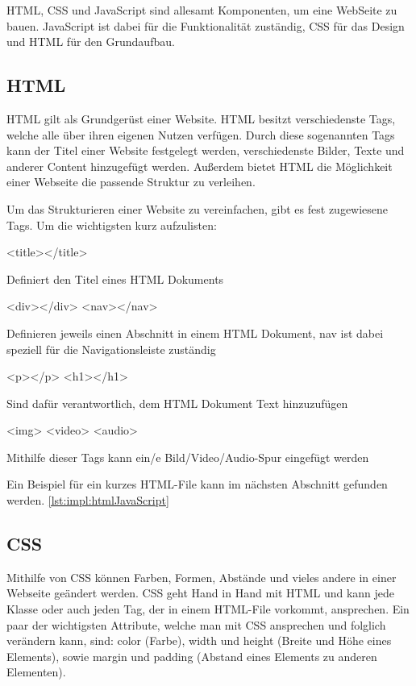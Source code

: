 HTML, CSS und JavaScript sind allesamt Komponenten, um eine WebSeite zu bauen. JavaScript ist dabei für die Funktionalität zuständig, CSS für das Design und HTML für den Grundaufbau.

\subsection{HTML}
HTML gilt als Grundgerüst einer Website. HTML besitzt verschiedenste Tags, welche alle über ihren eigenen Nutzen verfügen. Durch diese sogenannten Tags kann der Titel einer Website festgelegt werden, verschiedenste Bilder, Texte und anderer Content hinzugefügt werden. Außerdem bietet HTML die Möglichkeit einer Webseite die passende Struktur zu verleihen. \cite{durchstartenHTML}

Um das Strukturieren einer Website zu vereinfachen, gibt es fest zugewiesene Tags. Um die wichtigsten kurz aufzulisten:
 
\begin{compactitem}
    \item [<title></title>]
    \item Definiert den Titel eines HTML Dokuments
    \item [<div></div> <nav></nav>]
    \item Definieren jeweils einen Abschnitt in einem HTML Dokument, nav ist dabei speziell für die Navigationsleiste zuständig
    \item [<p></p> <h1></h1>]
    \item Sind dafür verantwortlich, dem HTML Dokument Text hinzuzufügen
    \item [<img> <video> <audio>]
    \item Mithilfe dieser Tags kann ein/e Bild/Video/Audio-Spur eingefügt werden
\end{compactitem}
\cite{durchstartenHTML}
 
Ein Beispiel für ein kurzes HTML-File kann im nächsten Abschnitt gefunden werden. \ref{lst:impl:htmlJavaScript}
 
\subsection{CSS}
Mithilfe von CSS können Farben, Formen, Abstände und vieles andere in einer Webseite geändert werden. CSS geht Hand in Hand mit HTML und kann jede Klasse oder auch jeden Tag, der in einem HTML-File vorkommt, ansprechen. Ein paar der wichtigsten Attribute, welche man mit CSS ansprechen und folglich verändern kann, sind: color (Farbe), width und height (Breite und Höhe eines Elements), sowie margin und padding (Abstand eines Elements zu anderen Elementen).
 
